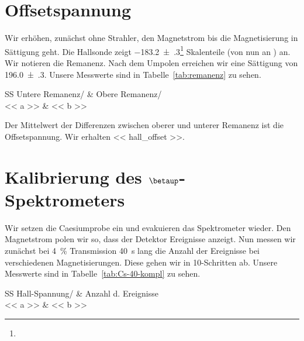 \documentclass[11pt, ngerman, fleqn, DIV=15, headinclude, BCOR=2cm]{scrreprt}
\begin{document}
\section{Offsetspannung}

Wir erhöhen, zunächst ohne Strahler, den Magnetstrom bis die Magnetisierung
in Sättigung geht. Die Hallsonde zeigt
\num{-183.2(3)}\footnote{\erklaerungFehlerNotation} Skalenteile (von nun an
\si{\skt}) an. Wir notieren die
Remanenz. Nach dem Umpolen erreichen wir eine Sättigung von
\SI{196.0(3)}{\skt}. Unsere Messwerte sind in Tabelle~\ref{tab:remanenz} zu
sehen.

\begin{table}[htbp]
    \centering
    \begin{tabular}{SS}
        {Untere Remanenz/\si{\skt}} & {Obere Remanenz/\si{\skt}}\\
        \midrule
        << a >> & << b >> \\
    \end{tabular}
    \caption{%
        Untere und obere Remanenz der Spektrometer-Hysterese.
    }
    \label{tab:remanenz}
\end{table}

Der Mittelwert der Differenzen zwischen oberer und unterer Remanenz ist die
Offsetspannung. Wir erhalten \SI{<< hall_offset >>}{\skt}.

\section{Kalibrierung des $\betaup$-Spektrometers}

Wir setzen die Caesiumprobe ein und evakuieren das Spektrometer wieder. Den
Magnetstrom polen wir so, dass der Detektor Ereignisse anzeigt. Nun messen
wir zunächst bei \SI{4}{\percent} Transmission \SI{40}{\second} lang die
Anzahl der Ereignisse bei verschiedenen Magnetisierungen. Diese gehen wir in
\SI{10}{\skt}-Schritten ab. Unsere Messwerte sind in
Tabelle~\ref{tab:Cs-40-kompl} zu sehen.

\begin{table}[htbp]
    \centering
    \begin{tabular}{SS}
        {Hall-Spannung/\si{\skt}} & {Anzahl d. Ereignisse} \\
        \midrule
        << a >> & << b >> \\
    \end{tabular}
    \caption{%
        Messwerte zur Kalibrierung des Spektrometers. Probe: ${}^{137}$Cs,
        Zeit: \SI{40}{\second}, Transmission: \SI{4}{\percent}.
    }
    \label{tab:Cs-40-kompl}
\end{table}
\end{document}
